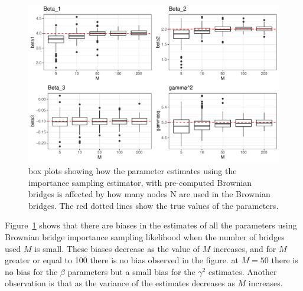 \begin{figure}[H]
    \centering
    \includegraphics[width=\linewidth]{Images/Results/varying M estimates boxplot BB.pdf}
    \caption[Box plots of Parameter Estimates for various Ns]{box plots showing how the parameter estimates using the importance sampling estimator, with pre-computed Brownian bridges is affected by how many nodes N are used in the Brownian bridges. The red dotted lines show the true values of the parameters.}
    \label{fig:varying M boxplots brownian bridge}
\end{figure}

Figure~\ref{fig:varying M boxplots brownian bridge} shows that there are biases in the estimates of all the parameters using Brownian bridge importance sampling likelihood when the number of bridges used $M$ is small. These biases decrease as the value of $M$ increases, and for $M$ greater or equal to 100 there is no bias observed in the figure. at $M =50$ there is no bias for the $\beta$ parameters but a small bias for the $\gamma^2$ estimates. Another observation is that as the variance of the estimates decreases as $M$ increases.



